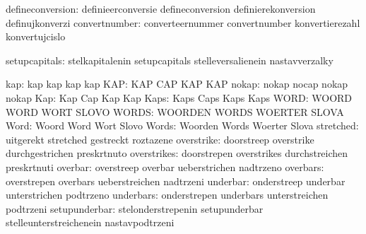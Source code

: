              defineconversion:  definieerconversie           defineconversion
                                definierekonversion          definujkonverzi
                convertnumber:  converteernummer             convertnumber
                                konvertierezahl              konvertujcislo

                setupcapitals:  stelkapitalenin              setupcapitals
                                stelleversalienein           nastavverzalky

                          kap:  kap                          kap
                                kap                          kap
                          KAP:  KAP                          CAP
                                KAP                          KAP
                        nokap:  nokap                        nocap
                                nokap                        nokap
                          Kap:  Kap                          Cap
                                Kap                          Kap
                         Kaps:  Kaps                         Caps
                                Kaps                         Kaps
                         WORD:  WOORD                        WORD
                                WORT                         SLOVO
                        WORDS:  WOORDEN                      WORDS
                                WOERTER                      SLOVA
                         Word:  Woord                        Word
                                Wort                         Slovo
                        Words:  Woorden                      Words
                                Woerter                      Slova
                    stretched:  uitgerekt                    stretched
                                gestreckt                    roztazene
                   overstrike:  doorstreep                   overstrike
                                durchgestrichen              preskrtnuto
                  overstrikes:  doorstrepen                  overstrikes
                                durchstreichen               preskrtnuti
                      overbar:  overstreep                   overbar
                                ueberstrichen                nadtrzeno
                     overbars:  overstrepen                  overbars
                                ueberstreichen               nadtrzeni
                     underbar:  onderstreep                  underbar
                                unterstrichen                podtrzeno
                    underbars:  onderstrepen                 underbars
                                unterstreichen               podtrzeni
                setupunderbar:  stelonderstrepenin           setupunderbar
                                stelleunterstreichenein      nastavpodtrzeni

